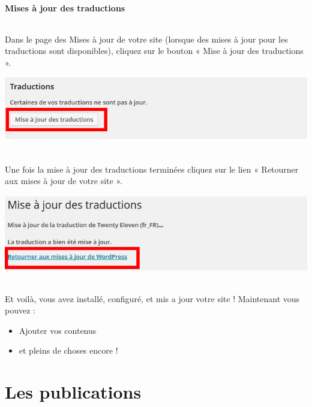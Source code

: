 \documentclass[10pt,a4paper]{article}
\begin{document}
\subsection{Mises à jour des traductions}
\paragraph{}Dans le page des Mises à jour de votre site (lorsque des mises à jour pour les traductions sont disponibles), cliquez sur le bouton « Mise à jour des traductions ».
\begin{center}
\includegraphics[scale=0.35]{img/0057.png}
\end{center}
\paragraph{}Une fois la mise à jour des traductions terminées cliquez sur le lien « Retourner aux mises à jour de votre site ».
\begin{center}
\includegraphics[scale=0.35]{img/0058.png}
\end{center}
\paragraph{}Et voilà, vous avez installé, configuré, et mis a jour votre site ! Maintenant vous pouvez :
\begin{itemize}
\item Ajouter vos contenus
\item et pleins de choses encore !
\end{itemize}
\newpage

\part{Les publications}
\newpage
\end{document}
